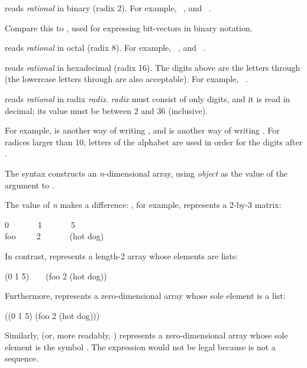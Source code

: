 \begin{flushdesc}
\item[\cd{\#B}]
 reads \emph{rational} in binary (radix 2).
For example,  \EQ\ , and  \EQ\ .
\begin{new}
Compare this to \cd{\#*}, used for expressing bit-vectors in binary notation.
\end{new}

\item[\cd{\#O}]
 reads \emph{rational} in octal (radix 8).
For example,  \EQ\ , and  \EQ\ .

\item[\cd{\#X}]
 reads \emph{rational} in hexadecimal (radix 16).
The digits above  are the letters  through  (the lowercase
letters  through  are also acceptable).  For example,
 \EQ\ .

\item[\cd{\#\emph{n}R}]
 reads \emph{rational} in radix \emph{radix}.
\emph{radix} must consist of only digits, and
it is read in decimal; its value must be between 2 and 36 (inclusive).


For example,  is another way of writing , and 
is another way of writing .  For radices larger than 10, letters of
the alphabet are used in order for the digits after .

\item[\cd{\#\emph{n}A}]
The syntax  constructs an \emph{n}-dimensional array,
using \emph{object} as the value of the  argument
to .

The value of \emph{n} makes a difference:
, for example, represents a 2-by-3 matrix:
\begin{lisp}
0~~~~~~~1~~~~~~~5 \\
foo~~~~~2~~~~~~~(hot dog)
\end{lisp}
In contrast,  represents a length-2
array whose elements are lists:
\begin{lisp}
(0 1 5)~~~~(foo 2 (hot dog))
\end{lisp}
Furthermore,  represents a zero-dimensional
array whose sole element is a list:
\begin{lisp}
((0 1 5) (foo 2 (hot dog)))
\end{lisp}
Similarly,  (or, more readably, ) represents
a zero-dimensional array whose sole element is the symbol .
The expression  would not be legal because  is
not a sequence.


\end{flushdesc}
